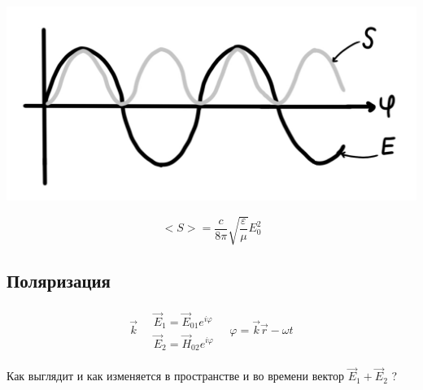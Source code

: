 \begin{minipage}[c]{0.6\textwidth} %
    \includegraphics[width=\textwidth]{im/100.png}%
\end{minipage}%
\hfill
\begin{minipage}[c]{0.6\textwidth} %
    \[
    <S>=\frac{c}{8\pi} \sqrt{\frac{\varepsilon}{\mu}} E_0^2
    \]
\end{minipage}

\subsection*{Поляризация}

\[
\begin{aligned}
    \vec{k}
    \quad
    \begin{array}{ll}
        \vec{E}_1=\vec{E}_{01}e^{i\varphi} \\
        \vec{E}_2=\vec{H}_{02}e^{i\varphi}     
    \end{array}
    \quad
    \varphi=\vec{k}\vec{r}-\omega t
\end{aligned}
\]

Как выглядит и как изменяется в пространстве и во времени вектор \( \vec{E}_1+\vec{E}_2 \) ?

